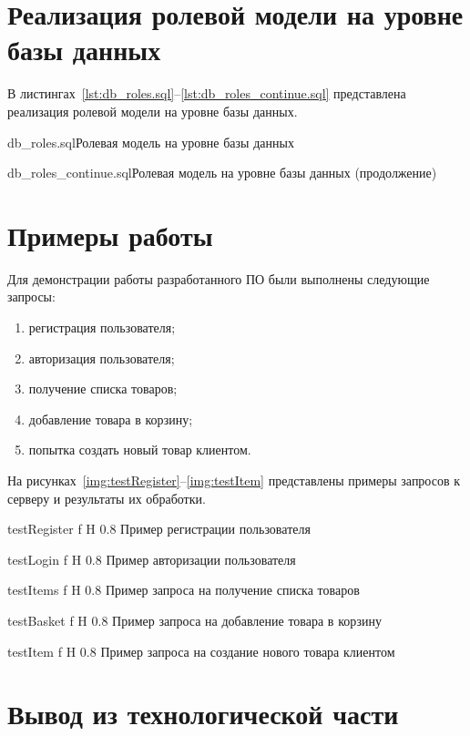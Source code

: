\documentclass{bmstu}
\begin{document}
\section{Реализация ролевой модели на уровне базы данных}

В листингах~\ref{lst:db_roles.sql}--\ref{lst:db_roles_continue.sql} представлена реализация ролевой модели на уровне базы данных.

{db_roles.sql}{Ролевая модель на уровне базы данных}

{db_roles_continue.sql}{Ролевая модель на уровне базы данных (продолжение)}


\section{Примеры работы}

Для демонстрации работы разработанного ПО были выполнены следующие запросы:

\begin{enumerate}
	\item регистрация пользователя;
	\item авторизация пользователя;
	\item получение списка товаров;
	\item добавление товара в корзину;
	\item попытка создать новый товар клиентом.
\end{enumerate}

На рисунках~\ref{img:testRegister}--\ref{img:testItem} представлены примеры запросов к серверу и результаты их обработки.

{testRegister}
{f}
{H}
{0.8\textwidth}
{Пример регистрации пользователя}

{testLogin}
{f}
{H}
{0.8\textwidth}
{Пример авторизации пользователя}

{testItems}
{f}
{H}
{0.8\textwidth}
{Пример запроса на получение списка товаров}

{testBasket}
{f}
{H}
{0.8\textwidth}
{Пример запроса на добавление товара в корзину}

{testItem}
{f}
{H}
{0.8\textwidth}
{Пример запроса на создание нового товара клиентом}


\section*{Вывод из технологической части}
\end{document}
